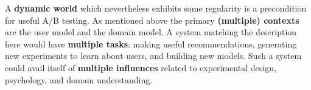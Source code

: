 A \textbf{dynamic world} which nevertheless exhibits some regularity
is a precondition for useful A/B testing.  As mentioned above the
primary \textbf{(multiple) contexts} are the user model and the domain
model.  A system matching the description here would have
\textbf{multiple tasks}: making useful recommendations, generating new
experiments to learn about users, and building new models.  Such a
system could avail itself of \textbf{multiple influences} related to
experimental design, psychology, and domain understanding.





